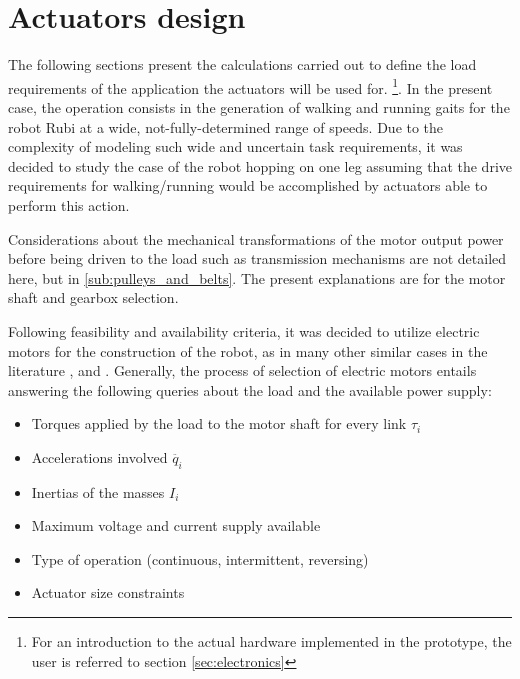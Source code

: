 
\section{Actuators design}
\label{sec_actuators}
The following sections present the calculations carried out to define the load requirements of the application the actuators will be used for.
\footnote{For an introduction to the actual hardware implemented in the prototype, the user is referred to section \ref{sec:electronics}}.
In the present case, the operation consists in the generation of walking and running gaits for the robot Rubi at a wide, not-fully-determined range of speeds. 
Due to the complexity of modeling such wide and uncertain task requirements, it was decided to study the case of the robot hopping on one leg assuming that the drive requirements for walking/running would be accomplished by actuators able to perform this action.

Considerations about the mechanical transformations of the motor output power before being driven to the load such as transmission mechanisms are not detailed here, but in \ref{sub:pulleys_and_belts}.
The present explanations are for the motor shaft and gearbox selection.

Following feasibility and availability criteria, it was decided to utilize electric motors for the construction of the robot, as in many other similar cases in the literature \cite{runbot1}, \cite{phides} and \cite{biobiped}.
Generally, the process of selection of electric motors entails answering the following queries about the load and the available power supply:

\begin{itemize}
\label{list:motor_selection}
	\item Torques applied by the load to the motor shaft for every link $\tau_{i}$
	\item Accelerations involved $\ddot{q_{i}}$
	\item Inertias of the masses $I_{i}$
	\item Maximum voltage and current supply available 
	\item Type of operation (continuous, intermittent, reversing)
	\item Actuator size constraints
\end{itemize}

